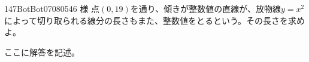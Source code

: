 \begin{prob}{147}{}{BotBot07080546 様}
 点$(0,19)$を通り、傾きが整数値の直線が、放物線$y=x^2$によって切り取られる線分の長さもまた、整数値をとるという。その長さを求めよ。
\end{prob}
ここに解答を記述。